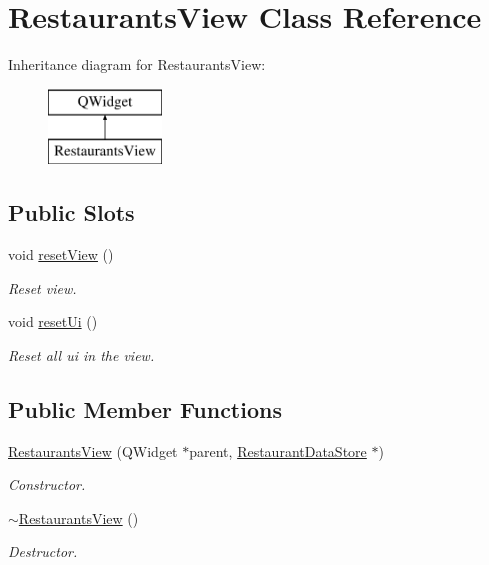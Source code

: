 \hypertarget{classRestaurantsView}{\section{Restaurants\-View Class Reference}
\label{classRestaurantsView}
}
Inheritance diagram for Restaurants\-View\-:\begin{figure}[H]
\begin{center}
\leavevmode
\includegraphics[height=2.000000cm]{classRestaurantsView}
\end{center}
\end{figure}
\subsection*{Public Slots}
\begin{DoxyCompactItemize}
\item 
void \hyperlink{classRestaurantsView_ae5fe4c7bf8970905496fdf55ca4741c6}{reset\-View} ()
\begin{DoxyCompactList}\small\item\em Reset view. \end{DoxyCompactList}\item 
void \hyperlink{classRestaurantsView_a13c38f1c5fef460f6f3bce488857f58c}{reset\-Ui} ()
\begin{DoxyCompactList}\small\item\em Reset all ui in the view. \end{DoxyCompactList}\end{DoxyCompactItemize}
\subsection*{Public Member Functions}
\begin{DoxyCompactItemize}
\item 
\hyperlink{classRestaurantsView_aeba0fdce5e48ca0b103923c6e3456890}{Restaurants\-View} (Q\-Widget $\ast$parent, \hyperlink{classRestaurantDataStore}{Restaurant\-Data\-Store} $\ast$)
\begin{DoxyCompactList}\small\item\em Constructor. \end{DoxyCompactList}\item 
\hyperlink{classRestaurantsView_a176dd3f9964c44886194ce3907f97289}{$\sim$\-Restaurants\-View} ()
\begin{DoxyCompactList}\small\item\em Destructor. \end{DoxyCompactList}\end{DoxyCompactItemize}


